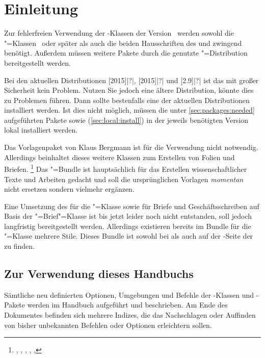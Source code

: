 \chapter{Einleitung}
Zur fehlerfreien Verwendung der \TUDScript-Klassen der Version~\vTUDScript{} 
werden sowohl die \KOMAScript"=Klassen~\vKOMAScript{} oder später als auch die 
beiden Hausschriften des \CDs \Univers und \DIN zwingend benötigt. Außerdem 
müssen weitere Pakete durch die genutzte "=Distribution 
bereitgestellt werden. 

Bei den aktuellen Distributionen
[2015]|?|,
[2015]|?| und 
[2.9]|?|
ist das mit großer Sicherheit kein Problem. Nutzen Sie jedoch eine ältere 
Distribution, könnte dies zu Problemen führen. Dann sollte bestenfalls eine der 
aktuellen Distributionen installiert werden. Ist dies nicht möglich, müssen die 
unter \autoref{sec:packages:needed} aufgeführten Pakete sowie \TUDScript 
(\autoref{sec:local:install}) in der jeweils benötigten Version lokal 
installiert werden.

Das Vorlagenpaket von Klaus Bergmann ist für die Verwendung nicht notwendig. 
Allerdings beinhaltet dieses weitere Klassen zum Erstellen von Folien 
und Briefen.%
\footnote{%
  , , , , 
  , 
}
Das \TUDScript"=Bundle ist hauptsächlich für das Erstellen wissenschaftlicher 
Texte und Arbeiten gedacht und soll die ursprünglichen Vorlagen \emph{momentan} 
nicht ersetzen sondern vielmehr ergänzen. 

Eine Umsetzung des \CDs für die "=Klasse sowie für Briefe und 
Geschäftsschreiben auf Basis der \KOMAScript"=Brief"=Klasse  
ist bis jetzt leider noch nicht entstanden, soll jedoch langfristig 
bereitgestellt werden. Allerdings existieren bereits im Bundle 
 für die "=Klasse mehrere Stile. Dieses 
Bundle ist sowohl bei  als 
auch auf der  
{-Seite der \TnUD} zu finden.



\section{Zur Verwendung dieses Handbuchs}
Sämtliche neu definierten Optionen, Umgebungen und Befehle der 
\TUDScript-Klassen und \TUDScript-Pakete werden im Handbuch aufgeführt und 
beschrieben. Am Ende des Dokumentes befinden sich mehrere Indizes, die das 
Nachschlagen oder Auffinden von bisher unbekannten Befehlen oder Optionen 
erleichtern sollen.

